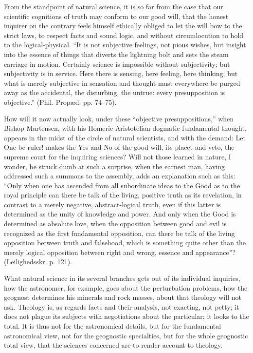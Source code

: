 \documentclass[12pt]{book}
\newcommand{\opage}[1]{\marginnote{\footnotesize\textit{[#1]}}}
\begin{document}
From the standpoint of natural science, it is so far from the case that our scientific cognitions of truth may conform to our good will, that the honest inquirer on the contrary feels himself ethically obliged to let the will bow to the strict laws, to respect facts and sound logic, and without circumlocution to hold to the logical-physical. ``It is not subjective feelings, not pious wishes, but insight into the essence of things that diverts the lightning bolt and sets the steam carriage
\opage{12}\setcounter{footnote}{0}%
in motion. Certainly science is impossible without subjectivity; but subjectivity is in service. Here there is sensing, here feeling, here thinking; but what is merely subjective in sensation and thought must everywhere be purged away as the accidental, the disturbing, the untrue: every presupposition is objective.'' (Phil. Propæd. pp. 74--75).

How will it now actually look, under these ``objective presuppositions,'' when Bishop Martensen, with his Homeric-Aristotelian-dogmatic fundamental thought, appears in the midst of the circle of natural scientists, and with the demand: Let One be ruler! makes the Yes and No of the good will, its placet and veto, the supreme court for the inquiring sciences? Will not those learned in nature, I wonder, be struck dumb at such a surprise, when the earnest man, having addressed such a summons to the assembly, adds an explanation such as this: ``Only when one has ascended from all subordinate ideas to the Good as to the royal principle can there be talk of the living, positive truth as its revelation, in contrast to a merely negative, abstract-logical truth, even if this latter is determined as the unity of knowledge and power. And only when the Good is determined as absolute love, when the opposition between good and evil is recognized as the first fundamental opposition, can there be talk of the living opposition between truth and falsehood, which is something quite other than the merely logical opposition between right and wrong, essence and appearance''? (Leilighedsskr. p. 121).

What natural science in its several branches gets out of its individual inquiries, how the astronomer, for example, goes about the perturbation problems, how the geognost determines his minerals and rock masses, about that theology will not ask. Theology is, as regards facts and their analysis, not exacting, not petty; it does not plague its subjects with negotiations about the
\opage{13}\setcounter{footnote}{0}%
particular; it looks to the total. It is thus not for the astronomical details, but for the fundamental astronomical view, not for the geognostic specialties, but for the whole geognostic total view, that the sciences concerned are to render account to theology.
\end{document}
